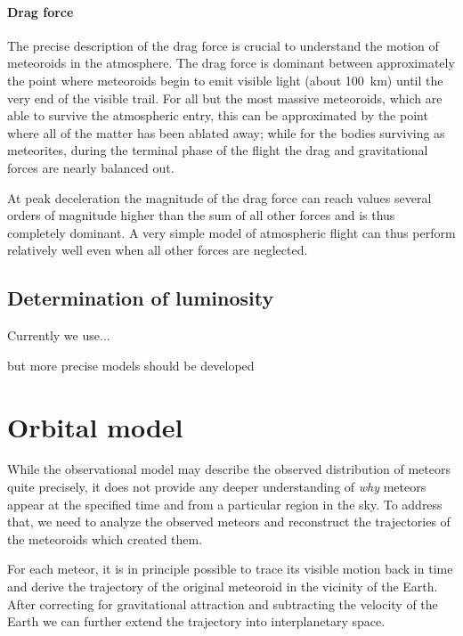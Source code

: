             \paragraph{Drag force} \label{said}
                The precise description of the drag force is crucial to understand the motion
                of meteoroids in the atmosphere. The drag force is dominant between approximately
                the point where meteoroids begin to emit visible light (about \SI{100}{\kilo\metre})
                until the very end of the visible trail. For all but the most massive meteoroids,
                which are able to survive the atmospheric entry, this can be approximated
                by the point where all of the matter has been ablated away; while for the bodies
                surviving as meteorites, during the terminal phase of the flight the drag and
                gravitational forces are nearly balanced out.

                At peak deceleration the magnitude of the drag force can reach values several orders of magnitude
                higher than the sum of all other forces and is thus completely dominant.
                A very simple model of atmospheric flight can thus perform relatively
                well even when all other forces are neglected.

    \subsection{Determination of luminosity} \label{sail}
        Currently we use... \citep{hill+2005} 

        \citep{bronshten1983}
        but more precise models should be developed


\section{Orbital model} \label{mo}
    While the observational model may describe the observed distribution of meteors quite precisely,
    it does not provide any deeper understanding of \textit{why} meteors appear
    at the specified time and from a particular region in the sky.
    To address that, we need to analyze the observed meteors and reconstruct
    the trajectories of the meteoroids which created them.

    For each meteor, it is in principle possible to trace its visible motion back in time
    and derive the trajectory of the original meteoroid in the vicinity of the Earth.
    After correcting for gravitational attraction and subtracting the velocity of the Earth
    we can further extend the trajectory into interplanetary space.

